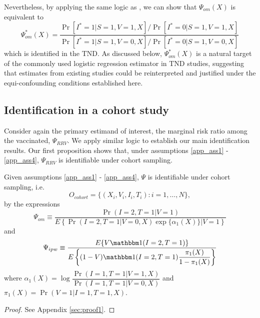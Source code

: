 \documentclass[11pt]{article}
\begin{document}
Nevertheless, by applying the same logic as \textcite{breslow_regression_1976}, we can show that $\Psi_{om}(X)$ is equivalent to
\begin{equation}\label{eqn:or_estimand_tnd}
    \Psi^*_{om}(X) = \dfrac{\Pr[I^* = 1 | S = 1, V = 1, X]/\Pr[I^* = 0 | S = 1, V = 1, X]}{\Pr[I^* = 1 | S = 1, V = 0, X]/\Pr[I^* = 0 | S = 1, V = 0, X]}
\end{equation}  
which is identified in the TND. As discussed below, $\Psi^*_{om}(X)$ is a natural target of the commonly used logistic regression estimator in TND studies, suggesting that estimates from existing studies could be reinterpreted and justified under the equi-confounding conditions established here.

\subsection{Identification in a cohort study}
Consider again the primary estimand of interest, the marginal risk ratio among the vaccinated, $\Psi_{RRV}$. We apply similar logic to establish our main identification results. Our first proposition shows that, under  assumptions \ref{app_ass1} - \ref{app_ass4}, $\Psi_{RRV}$ is identifiable under cohort sampling. 
\begin{proposition}\label{prop1}
    Given assumptions \ref{app_ass1} - \ref{app_ass4}, $\Psi$ is identifiable under cohort sampling, i.e. 
    $$O_{cohort} = \{(X_i, V_i, I_i, T_i) : i = 1, \ldots, N\},$$ 
    by the expressions 
    \begin{equation}\label{eqn:om_estimand}
        \Psi_{om} \equiv \dfrac{\Pr(I = 2, T = 1 | V = 1)}{E\left\{\Pr(I = 2, T = 1 | V = 0, X) \exp\{\alpha_1(X)\} \Big| V = 1 \right\}}
    \end{equation}
    and 
    \begin{equation}\label{eqn:ipw_estimand}
        \Psi_{ipw} \equiv \dfrac{E\{V \mathbbm 1 (I = 2, T = 1)\}}{E\left\{ (1 - V) \mathbbm 1(I = 2, T = 1) \dfrac{\pi_1(X)}{1 - \pi_1(X)}\right\}}
    \end{equation}
    where $\alpha_1(X) = \log \dfrac{\Pr(I = 1, T = 1 | V = 1, X)}{\Pr(I = 1, T = 1 | V = 0, X)}$ and $\pi_1(X) = \Pr(V = 1| I = 1, T = 1, X)$.
    \end{proposition}

    \begin{proof}
        See Appendix \ref{sec:proof1}.
    \end{proof}
    
\end{document}

